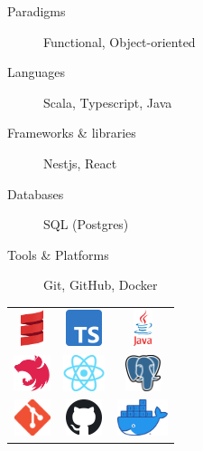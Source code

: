 \begin{MainPart}
  \begin{minipage}{0.55\textwidth}
    \begin{description}
      \item[Paradigms] Functional, Object-oriented
      \item[Languages] Scala, Typescript, Java
      \item[Frameworks \& libraries] Nestjs, React
      \item[Databases] SQL (Postgres)
      \item[Tools \& Platforms] Git, GitHub, Docker
    \end{description}
  \end{minipage}
  \hfill
  \begin{minipage}{0.40\linewidth}
    \begin{tabular}{ccc}
      \includegraphics[height=30pt]{img/scala-spiral.png} & \includegraphics[height=30pt]{img/typescript.png} & \includegraphics[height=30pt]{img/java.png}       \\
      \includegraphics[height=30pt]{img/nestjs.png}       & \includegraphics[height=30pt]{img/react.png}      & \includegraphics[height=30pt]{img/postgresql.png} \\
      \includegraphics[height=30pt]{img/git.png}          & \includegraphics[height=30pt]{img/github.png}     & \includegraphics[height=30pt]{img/docker.png}
    \end{tabular}
  \end{minipage}
  \vspace{0.3cm}


\end{MainPart}

